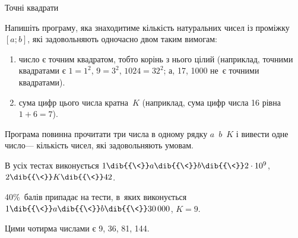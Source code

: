 \begin{problemAllDefault}{Точні квадрати}

Напишіть програму, яка знаходитиме кількість натуральних чисел із проміжку $[a; b]$, які задовольняють одночасно двом таким вимогам:
\begin{enumerate}
\item
число є точним квадратом, тобто корінь з нього цілий (наприклад, точними квадратами є ${1{=}1^2}$, ${9{=}3^2}$, ${1024{=}32^2}$; а, 17, 1000 не~є точними квадратами).
\item
сума цифр цього числа кратна~$K$ (наприклад, сума цифр числа 16 рівна ${1{+}6{=}7}$).
\end{enumerate}
Програма повинна прочитати три числа в одному рядку $a$~$b$~$K$ і вивести одне число\nolinebreak[3] --- кількість чисел, які задовольняють умовам.

\Scoring	В усіх тестах виконується $1\dib{{\<}}a\dib{{\<}}b\dib{{\<}}2\cdot10^9$, $2\dib{{\<}}K\dib{{\<}}42$. 

40\%~балів припадає на тести, в~яких виконується $1\dib{{\<}}a\dib{{\<}}b\dib{{\<}}30\,000$, ${K{=}9}$.


\Example
\begin{exampleSimple}{5em}{3em}%
%
\end{exampleSimple}

\Note	Цими чотирма числами є 9, 36, 81, 144. 

\end{problemAllDefault}
